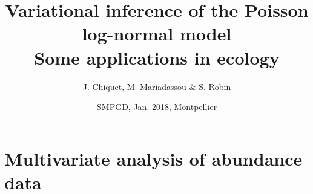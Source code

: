 \documentclass[10pt]{beamer}
\newcommand{\fignet}{/home/robin/Bureau/RECHERCHE/RESEAUX/EXPOSES/FIGURES}
\begin{document}

\title[Variational inference of the PLN model]{Variational inference of the Poisson log-normal model \\
  Some applications in ecology}

\author[S. Robin]{J. Chiquet, M. Mariadassou \& \underline{S. Robin}}


\date[SMPGD, Montpellier]{SMPGD, Jan. 2018, Montpellier}

\maketitle

\section{Multivariate analysis of abundance data}

\end{document}
